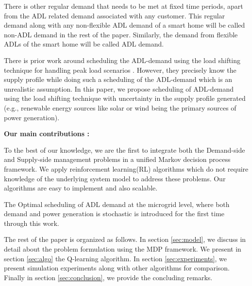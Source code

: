 There is other regular demand that needs to be met at fixed time periods, apart from the ADL related demand associated with any customer. This regular demand along with any non-flexible ADL demand of a smart home will be called non-ADL demand in the rest of the paper. Similarly, the demand from flexible ADLs of the smart home will be called ADL demand.

There is prior work around scheduling the ADL-demand using the load shifting technique for handling  peak load scenarios \cite{CL2014}. However, they precisely know the supply profile while doing such a scheduling of the ADL-demand which is an unrealistic assumption. In this paper, we propose scheduling of ADL-demand using the load shifting technique with uncertainty in the supply profile generated (e.g., renewable energy sources like solar or wind being the primary sources of power generation).


\textbf{Our main contributions :}\\
\begin{inparaenum}[\bfseries (i)]
\item To the best of our knowledge, we are the first  to integrate both the Demand-side and Supply-side management problems  in a unified Markov decision process framework. We apply reinforcement learning(RL) algorithms which do not require knowledge of the underlying system model to address these problems. Our algorithms are easy to implement and also scalable.\\
\item The Optimal scheduling of ADL demand at the microgrid level, where both  demand and power generation is stochastic is  introduced for the first time through this work. \\    
\end{inparaenum}
The rest of the paper is organized as follows. In section \ref{sec:model}, we discuss in detail about the problem formulation using the MDP framework. We present  in section \ref{sec:algo} the Q-learning algorithm. In section \ref{sec:experiments}, we present simulation experiments along with other algorithms for comparison. Finally in section \ref{sec:conclusion}, we provide the concluding remarks.